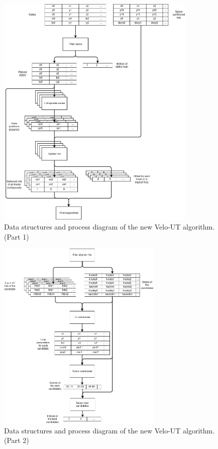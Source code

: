 \documentclass[12pt]{article}
\begin{document}
\begin{figure}[H]
	\begin{center}
		\includegraphics[width=0.85\textwidth]{velout_opt_datastruct_flow_p1}
	\end{center}
	\caption{Data structures and process diagram of the new Velo-UT algorithm. (Part 1)}
	\label{fig_velout_opt_datastruct_flow_p1}
\end{figure}

\begin{figure}[H]
	\begin{center}
		\includegraphics[width=0.7\textwidth]{velout_opt_datastruct_flow_p2}
	\end{center}
	\caption{Data structures and process diagram of the new Velo-UT algorithm. (Part 2)}
	\label{fig_velout_opt_datastruct_flow_p2}
\end{figure}
\end{document}
